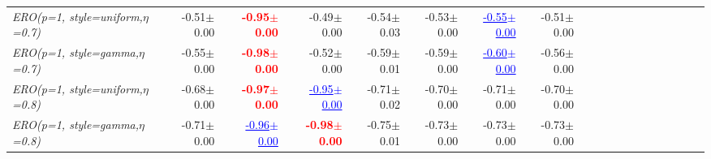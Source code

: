 \documentclass[nohyperref]{article}
\theoremstyle{plain}
\theoremstyle{definition}
\theoremstyle{remark}
\newcommand{\red}[1]{\textcolor{red}{\textbf{#1}}}
\newcommand{\blue}[1]{\textcolor{blue}{\underline{#1}}}
\begin{document}
\begin{table*}[!ht]
{\begin{tabular}{lrrrrrrrrrrrrrrrrrr}
			{\it ERO(p=1, style=uniform,$\eta$=0.7)} & -0.51$\pm$0.00 & \red{-0.95$\pm$0.00} & -0.49$\pm$0.00 & -0.54$\pm$0.03 & -0.53$\pm$0.00 & \blue{-0.55$\pm$0.00} & -0.51$\pm$0.00 \\
			{\it ERO(p=1, style=gamma,$\eta$=0.7)} & -0.55$\pm$0.00 & \red{-0.98$\pm$0.00} & -0.52$\pm$0.00 & -0.59$\pm$0.01 & -0.59$\pm$0.00 & \blue{-0.60$\pm$0.00} & -0.56$\pm$0.00 \\
			{\it ERO(p=1, style=uniform,$\eta$=0.8)} & -0.68$\pm$0.00 & \red{-0.97$\pm$0.00} & \blue{-0.95$\pm$0.00} & -0.71$\pm$0.02 & -0.70$\pm$0.00 & -0.71$\pm$0.00 & -0.70$\pm$0.00 \\
			{\it ERO(p=1, style=gamma,$\eta$=0.8)} & -0.71$\pm$0.00 & \blue{-0.96$\pm$0.00} & \red{-0.98$\pm$0.00} & -0.75$\pm$0.01 & -0.73$\pm$0.00 & -0.73$\pm$0.00 & -0.73$\pm$0.00 \\
\bottomrule
\end{tabular}}
\end{table*}
\end{document}
